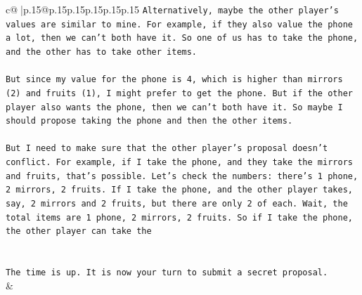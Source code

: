 \documentclass{article}
\begin{document}
{\begin{supertabular}{c@{$\;$}|p{.15\linewidth}@{}p{.15\linewidth}p{.15\linewidth}p{.15\linewidth}p{.15\linewidth}p{.15\linewidth}}
{{{\texttt{Alternatively, maybe the other player's values are similar to mine. For example, if they also value the phone a lot, then we can't both have it. So one of us has to take the phone, and the other has to take other items. } \\
\\ 
\texttt{But since my value for the phone is 4, which is higher than mirrors (2) and fruits (1), I might prefer to get the phone. But if the other player also wants the phone, then we can't both have it. So maybe I should propose taking the phone and then the other items. } \\
\\ 
\texttt{But I need to make sure that the other player's proposal doesn't conflict. For example, if I take the phone, and they take the mirrors and fruits, that's possible. Let's check the numbers: there's 1 phone, 2 mirrors, 2 fruits. If I take the phone, and the other player takes, say, 2 mirrors and 2 fruits, but there are only 2 of each. Wait, the total items are 1 phone, 2 mirrors, 2 fruits. So if I take the phone, the other player can take the} \\
\\ 
\\ 
\texttt{The time is up. It is now your turn to submit a secret proposal.} \\
            }
        }
    }
    & \\ \\


\end{supertabular}}
\end{document}
